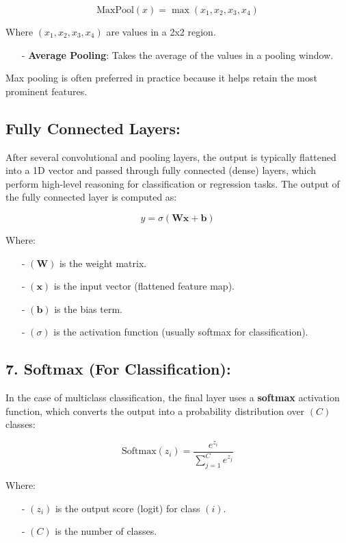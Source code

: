 \documentclass[10pt]{article}
\begin{document}
$$
\text{MaxPool}(x) = \max(x_1, x_2, x_3, x_4)
$$

Where $( x_1, x_2, x_3, x_4 )$ are values in a 2x2 region.

\begin{itemize}
   \item [-] {\bf Average Pooling}: Takes the average of the values in a pooling window.
\end{itemize}

Max pooling is often preferred in practice because it helps retain the most prominent features.

\subsection{{\bf Fully Connected Layers}:}
After several convolutional and pooling layers, the output is typically flattened into a 1D vector and passed through fully connected (dense) layers, which perform high-level reasoning for classification or regression tasks. The output of the fully connected layer is computed as:

$$
y = \sigma(\mathbf{W} \mathbf{x} + \mathbf{b})
$$

Where:

\begin{itemize}
   \item [-] $( \mathbf{W} )$ is the weight matrix.
   \item [-] $( \mathbf{x} )$ is the input vector (flattened feature map).
   \item [-] $( \mathbf{b} )$ is the bias term.
   \item [-] $( \sigma )$ is the activation function (usually softmax for classification).
\end{itemize}

\subsection{ 7. {\bf Softmax (For Classification)}:}
In the case of multiclass classification, the final layer uses a {\bf softmax} activation function, which converts the output into a probability distribution over $( C )$ classes:

$$
\text{Softmax}(z_i) = \frac{e^{z_i}}{\sum_{j=1}^{C} e^{z_j}}
$$

Where:
\begin{itemize}
   \item [-] $( z_i )$ is the output score (logit) for class $( i )$.
   \item [-] $( C )$ is the number of classes.
\end{itemize}
\end{document}
